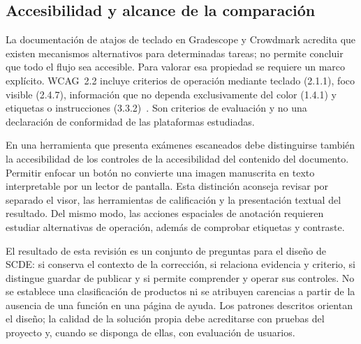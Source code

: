 \subsection{Accesibilidad y alcance de la comparación}

La documentación de atajos de teclado en Gradescope y Crowdmark acredita que
existen mecanismos alternativos para determinadas tareas; no permite concluir
que todo el flujo sea accesible. Para valorar esa propiedad se requiere un marco
explícito. WCAG~2.2 incluye criterios de operación mediante teclado (2.1.1), foco
visible (2.4.7), información que no dependa exclusivamente del color (1.4.1) y
etiquetas o instrucciones (3.3.2)~\cite{codex_wcag22_ui}. Son criterios de
evaluación y no una declaración de conformidad de las plataformas estudiadas.

En una herramienta que presenta exámenes escaneados debe distinguirse también
la accesibilidad de los controles de la accesibilidad del contenido del documento.
Permitir enfocar un botón no convierte una imagen manuscrita en texto interpretable
por un lector de pantalla. Esta distinción aconseja revisar por separado el visor,
las herramientas de calificación y la presentación textual del resultado. Del mismo
modo, las acciones espaciales de anotación requieren estudiar alternativas de
operación, además de comprobar etiquetas y contraste.

El resultado de esta revisión es un conjunto de preguntas para el diseño de SCDE:
si conserva el contexto de la corrección, si relaciona evidencia y criterio, si
distingue guardar de publicar y si permite comprender y operar sus controles.
No se establece una clasificación de productos ni se atribuyen carencias a partir
de la ausencia de una función en una página de ayuda. Los patrones descritos
orientan el diseño; la calidad de la solución propia debe acreditarse con pruebas
del proyecto y, cuando se disponga de ellas, con evaluación de usuarios.
